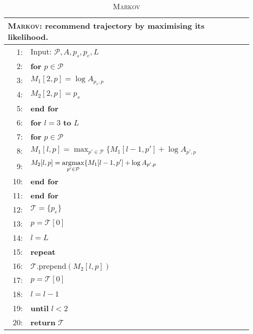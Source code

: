 \begin{table}
  \caption{\textsc{Markov}}
  \label{tab:markov}
\centering
\small
\begin{tabular}{rl}
\hline
\multicolumn{2}{l}{\textsc{Markov}: recommend trajectory by maximising its likelihood.} \\
\hline
 1:& Input: $\mathcal{P}, A, p_s, p_e, L$ \\
 2:&\textbf{for} $p \in \mathcal{P}$ \\
 3:&\hspace{10pt} $M_1[2, p] = \log A_{p_s, p}$ \\
 4:&\hspace{10pt} $M_2[2, p] = p_s$ \\
 5:&\textbf{end for} \\
 6:&\textbf{for} $l=3$ \textbf{to} $L$ \\
 7:&\hspace{10pt}\textbf{for} $p \in \mathcal{P}$ \\
 8:&\hspace{20pt}   \(\displaystyle M_1[l, p] = \max_{p' \in \mathcal{P}} \{ M_1[l-1, p'] + \log A_{p', p} \) \\
 9:&\hspace{20pt}   \(\displaystyle M_2[l, p] = \operatorname*{argmax}_{p' \in \mathcal{P}} \{ M_1[l-1, p'] + \log A_{p', p} \) \\
10:&\hspace{10pt}\textbf{end for} \\
11:&\textbf{end for} \\
12:&$\mathcal{T} = \{p_e\}$ \\
13:&$p = \mathcal{T}[0]$ \\
14:&$l = L$ \\
15:&\textbf{repeat} \\
16:&\hspace{10pt}$\mathcal{T}$.prepend$(M_2[l, p])$ \\
17:&\hspace{10pt}$p = \mathcal{T}[0]$ \\
18:&\hspace{10pt}$l = l - 1$ \\
19:&\textbf{until} $l < 2$ \\
20:&\textbf{return} $\mathcal{T}$ \\
\hline
\end{tabular}
\end{table}



